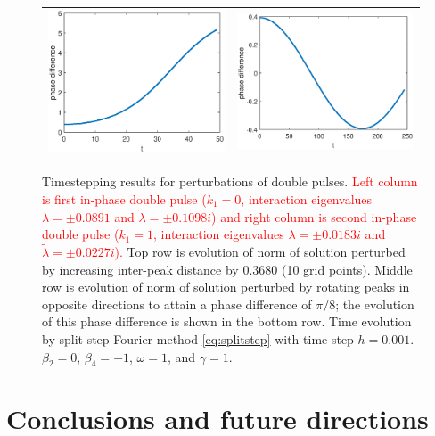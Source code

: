 \documentclass[12pt]{elsarticle}
\newcommand{\revised}[1]{ \textcolor{red}{#1} }
\begin{document}
\begin{figure}[H]
\begin{tabular}{cc}
\includegraphics[width=6cm]{images/DP0ppphasedifference} &
\includegraphics[width=6cm]{images/DP1ppphasedifference}
\end{tabular}
\caption{Timestepping results for perturbations of double pulses. \revised{Left column is first in-phase double pulse ($k_1 = 0$, interaction eigenvalues $\lambda = \pm 0.0891$ and $\tilde{\lambda} = \pm 0.1098 i$) and right column is second in-phase double pulse ($k_1 = 1$, interaction eigenvalues $\lambda = \pm 0.0183i$ and $\tilde{\lambda} = \pm 0.0227 i$).} Top row is evolution of norm of solution perturbed by increasing inter-peak distance by $0.3680$ (10 grid points). Middle row is evolution of norm of solution perturbed by rotating peaks in opposite directions to attain a phase difference of $\pi/8$; the evolution of this phase difference is shown in the bottom row. Time evolution by split-step Fourier method \cref{eq:splitstep} with time step $h = 0.001$. $\beta_2 = 0$, $\beta_4 = -1$, $\omega = 1$, and $\gamma = 1$.}
\label{fig:timestep0pp}
\end{figure}

\section{Conclusions and future directions}
\end{document}
